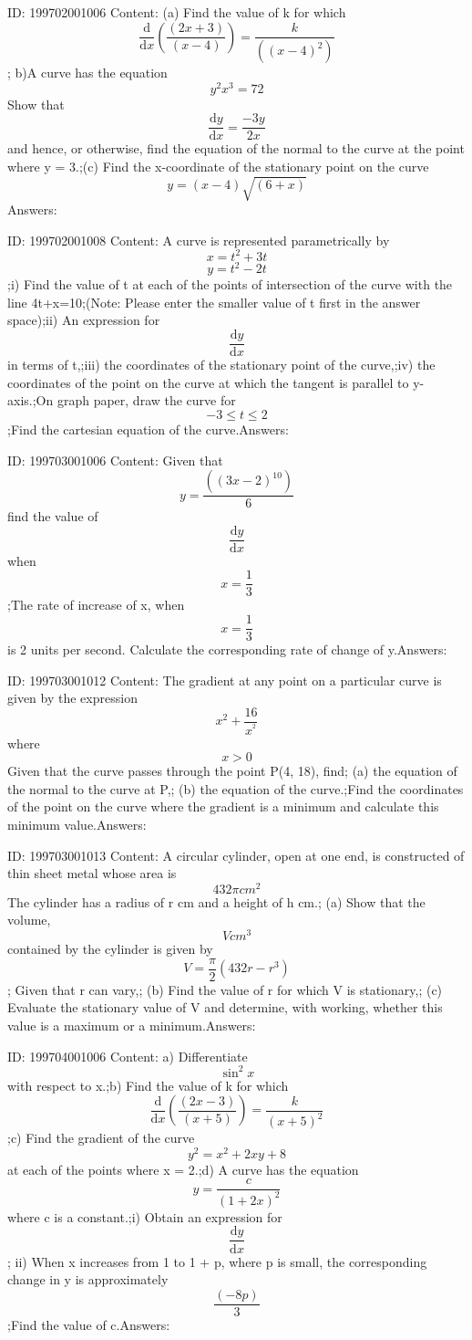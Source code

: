 \documentclass{article}
\begin{document}
ID: 199702001006
Content:
(a)	Find the value of k for which \[\frac{\mathrm{d} }{\mathrm{d} x}(\frac{(2x+3)}{(x-4)})=\frac{k}{((x-4)^2)}\]; b)A curve has the equation \[y^2x^3=72\] Show that \[\frac{\mathrm{d} y}{\mathrm{d} x}=\frac{-3y}{2x}\]and hence, or otherwise, find the equation of the normal to the curve at the point where y = 3.;(c) Find the x-coordinate of the stationary point on the curve \[y=(x-4)\sqrt{(6+x)}\]Answers:

ID: 199702001008
Content:
A curve is represented parametrically by \[x=t^2+3t\] \[y=t^2-2t\] ;i) Find the value of t at each of the points of intersection of the curve with the line 4t+x=10;(Note: Please enter the smaller value of t first in the answer space);ii) An expression for \[\frac{\mathrm{d} y}{\mathrm{d} x}\] in terms of t,;iii) the coordinates of the stationary point of the curve,;iv) the coordinates of the point on the curve at which the tangent is parallel to y-axis.;On graph paper, draw the curve for \[-3\leq t\leq 2\];Find the cartesian equation of the curve.Answers:

ID: 199703001006
Content:
Given that \[y=\frac{((3x-2)^{10})}{6}\]  find the value of  \[\frac{\mathrm{d} y}{\mathrm{d} x}\]when \[x=\frac{1}{3}\];The rate of increase of x, when \[x=\frac{1}{3}\]is 2 units per second. Calculate the corresponding rate of change of y.Answers:

ID: 199703001012
Content:
The gradient at any point on a particular curve is given by the expression \[x^2+\frac{16}{x^{^{2}}}\] where \[x > 0\] Given that the curve passes through the point P(4, 18), find; (a)	the equation of the normal to the curve at P,; (b)	the equation of the curve.;Find the coordinates of the point on the curve where the gradient is a minimum and calculate this minimum value.Answers:

ID: 199703001013
Content:
A circular cylinder, open at one end, is constructed of thin sheet metal whose area is \[432\pi cm^2\] The cylinder has a radius of r cm and a height of h cm.; (a)	Show that the volume, \[V cm^3\] contained by the cylinder is given by \[V=\frac{\pi }{2}(432r-r^3)\];  Given that r can vary,; (b)	Find the value of r for which V is stationary,; (c)	Evaluate the stationary value of V and determine, with working, whether this value is a maximum or a minimum.Answers:

ID: 199704001006
Content:
a) Differentiate \[\sin^2x\] with respect to x.;b) Find the value of k for which \[\frac{\mathrm{d} }{\mathrm{d} x}(\frac{(2x-3)}{(x+5)})=\frac{k}{(x+5)^2}\] ;c) Find the gradient of the curve \[y^2=x^2+2xy+8\]  at each of the points where x = 2.;d) A curve has the equation \[y=\frac{c}{(1+2x)^2}\] where c is a constant.;i) Obtain an expression for \[\frac{\mathrm{d} y}{\mathrm{d} x}\]; ii) When x increases from 1 to 1 + p, where p is small, the corresponding change in y is approximately \[\frac{(-8p)}{3}\] ;Find the value of c.Answers:
\end{document}
